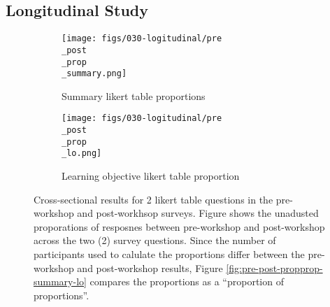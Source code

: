 \documentclass[030-workshop.tex]{subfiles}
\begin{document}
\subsection{Longitudinal Study}
\label{sse:longitudinal-study}

\begin{figure}[htb]
  \centering
  \begin{subfigure}[h]{0.45\textwidth}
      \centering
      \texttt{[image: figs/030-logitudinal/pre\\\_post\\\_prop\\\_summary.png]}
      \caption[Proportion of summary Likert table results]
      {Summary likert table proportions}
      \label{sfig:pre-post-prop-summary}
  \end{subfigure}
  \hfill
  \begin{subfigure}[h]{0.45\textwidth}
      \centering
      \texttt{[image: figs/030-logitudinal/pre\\\_post\\\_prop\\\_lo.png]}
      \caption[Proportion of learning objective Likert table results]
      {Learning objective likert table proportion}
      \label{sfig:pre-post-prop-lo}
  \end{subfigure}
  \caption[Summary table and learning objective likert proportion (pre, post)]
  {Cross-sectional results for 2 likert table questions in the
      pre-workshop and post-workhsop surveys.
      Figure shows the unadusted proporations of resposnes between pre-workshop and post-workshop
      across the two (2) survey questions.
      Since the number of participants used to calulate the proportions differ between the pre-workshop and post-workshop results,
      Figure \ref{fig:pre-post-propprop-summary-lo} compares the proportions as a ``proportion of proportions''.
  }
  \label{fig:pre-post-prop-summary-lo}
\end{figure}
\end{document}
